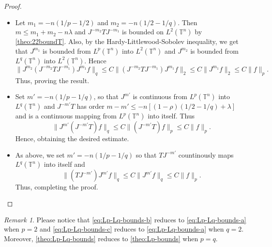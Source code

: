 \documentclass[12pt, reqno]{amsart}
\theoremstyle{definition}
\theoremstyle{remark}
\newtheorem{remark}[theorem]{Remark}
\numberwithin{equation}{section}
\begin{document}
\begin{proof}
    \begin{itemize}
        \item[(a)] Let $m_1 = -n(1/p - 1/2)$ and $m_2=-n(1/2 - 1/q)$. Then $m\leq m_1+m_2-n\lambda$ and $J^{-m_2}TJ^{-m_1}$ is bounded on $L^2(\mathbb{T}^n)$ by \cref{theo:22boundT}. Also, by the Hardy-Littlewood-Sobolev inequality, we get that $J^{m_1}$ is bounded from $L^p(\mathbb{T}^n)$ into $L^2(\mathbb{T}^n)$ and $J^{m_2}$ is bounded from $L^q(\mathbb{T}^n)$ into $L^2(\mathbb{T}^n)$. Hence 
        \begin{equation*}
            \| J^{m_2}(J^{-m_2}TJ^{-m_1})J^{m_1}f \|_q \leq C\|(J^{-m_2}TJ^{-m_1})J^{m_1}f  \|_2 \leq C\| J^{m_1}f \|_2 \leq C \| f\|_p.
        \end{equation*}
        Thus, proving the result.\\

        \item[(b)] Set $m' = -n(1/p - 1/q)$, so that $J^{m'}$ is continuous from  $L^p(\mathbb{T}^n)$ into $L^q(\mathbb{T}^n)$ and $J^{-m'}T$ has order $m-m' \leq -n[(1-\rho)(1/2 - 1/q) + \lambda]$ and is a continuous mapping from $L^p(\mathbb{T}^n)$ into itself. Thus 
        \begin{equation*}
            \| J^{m'}(J^{-m'}T)f \|_q \leq C\|(J^{-m'}T)f\|_p \leq C\|f\|_p.
        \end{equation*}
        Hence, obtaining the desired estimate.\\

        \item[(c)] As above, we set  $m' = -n(1/p - 1/q)$ so that $TJ^{-m'}$ countinously maps  $L^q(\mathbb{T}^n)$ into itself and
        \begin{equation*}
            \|(TJ^{-m'})J^{m'}f\|_q \leq C\|J^{m'}f\|_q \leq C\|f\|_p.
        \end{equation*}
        Thus, completing the proof.
    \end{itemize}
\end{proof}
\begin{remark}
    Please notice that \cref{eq:Lp-Lq-bounds-b} reduces to \cref{eq:Lp-Lq-bounds-a} when $p=2$ and \cref{eq:Lp-Lq-bounds-c} reduces to \cref{eq:Lp-Lq-bounds-a} when $q=2$. Moreover, \cref{theo:Lp-Lq-bounds} reduces to \cref{theo:Lp-bounds} when $p=q$.
\end{remark}
\end{document}
